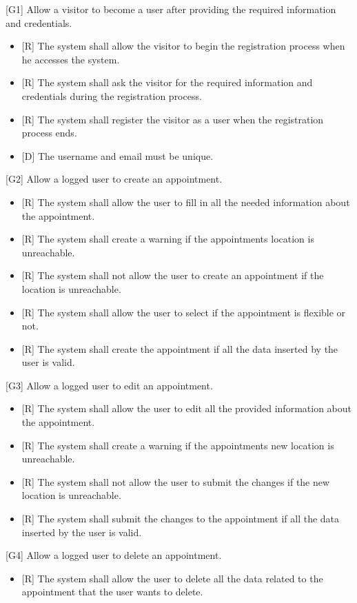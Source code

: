 \documentclass[12pt]{article}
\begin{document}
{[G1]} Allow a visitor to become a user after providing the required information and credentials.
\begin{itemize}
    \item{[R]} The system shall allow the visitor to begin the registration process when he accesses the system. 
    \item{[R]} The system shall ask the visitor for the required information and credentials during the registration process.
    \item{[R]} The system shall register the visitor as a user when the registration process ends.
    \item {[D]} The username and email must be unique.
\end{itemize}
{[G2]} Allow a logged user to create an appointment.
\begin{itemize}
    \item{[R]} The system shall allow the user to fill in all the needed information about the appointment.
    \item{[R]} The system shall create a warning if the appointments location is unreachable.
    \item{[R]} The system shall not allow the user to create an appointment if the location is unreachable.
    \item{[R]} The system shall allow the user to select if the appointment is flexible or not.
    \item{[R]} The system shall create the appointment if all the data inserted by the user is valid.
\end{itemize}
{[G3]} Allow a logged user to edit an appointment.
\begin{itemize}
    \item{[R]} The system shall allow the user to edit all the provided information about the appointment.
    \item{[R]} The system shall create a warning if the appointments new location is unreachable.
    \item{[R]} The system shall not allow the user to submit the changes if the new location is unreachable.
    \item{[R]} The system shall submit the changes to the appointment if all the data inserted by the user is valid.
\end{itemize}
{[G4]} Allow a logged user to delete an appointment.
\begin{itemize}
    \item{[R]} The system shall allow the user to delete all the data related to the appointment that the user wants to delete.
\end{itemize}
\end{document}
